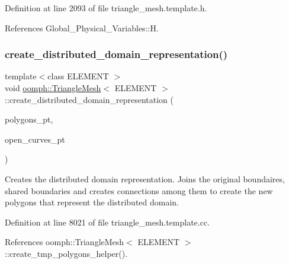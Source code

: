 Definition at line 2093 of file triangle\+\_\+mesh.\+template.\+h.



References Global\+\_\+\+Physical\+\_\+\+Variables\+::H.

\mbox{\label{classoomph_1_1TriangleMesh_a36fcc3de82185868d8adb95c73568315}} 
\subsubsection{\texorpdfstring{create\+\_\+distributed\+\_\+domain\+\_\+representation()}{create\_distributed\_domain\_representation()}}
{\footnotesize\ttfamily template$<$class E\+L\+E\+M\+E\+NT $>$ \\
void \hyperlink{classoomph_1_1TriangleMesh}{oomph\+::\+Triangle\+Mesh}$<$ E\+L\+E\+M\+E\+NT $>$\+::create\+\_\+distributed\+\_\+domain\+\_\+representation (\begin{DoxyParamCaption}\item[{Vector$<$ Triangle\+Mesh\+Polygon $\ast$$>$ \&}]{polygons\+\_\+pt,  }\item[{Vector$<$ Triangle\+Mesh\+Open\+Curve $\ast$$>$ \&}]{open\+\_\+curves\+\_\+pt }\end{DoxyParamCaption})\hspace{0.3cm}{\ttfamily [protected]}}



Creates the distributed domain representation. Joins the original boundaires, shared boundaries and creates connections among them to create the new polygons that represent the distributed domain. 



Definition at line 8021 of file triangle\+\_\+mesh.\+template.\+cc.



References oomph\+::\+Triangle\+Mesh$<$ E\+L\+E\+M\+E\+N\+T $>$\+::create\+\_\+tmp\+\_\+polygons\+\_\+helper().

\mbox{\label{classoomph_1_1TriangleMesh_a1589b532530c3a8ddfb88f93b2e832ea}} 
